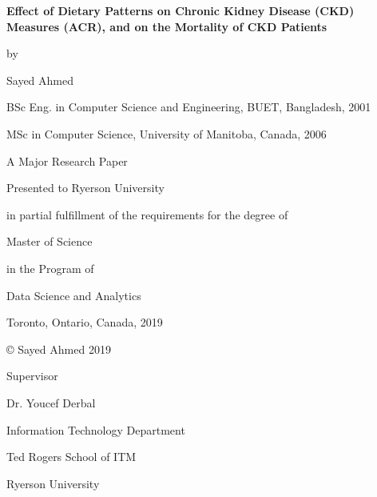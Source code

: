 
\begin{center}

\textbf{Effect of Dietary Patterns on Chronic Kidney Disease (CKD) Measures (ACR), and on the Mortality of CKD Patients}
\vspace{0.75cm}


by
\vspace{0.75cm}



Sayed Ahmed

BSc Eng. in Computer Science and Engineering, BUET, Bangladesh, 2001

MSc in Computer Science, University of Manitoba, Canada, 2006

\vspace{0.75cm}
A Major Research Paper

Presented to Ryerson University

in partial fulfillment of the requirements for the degree of

\vspace{0.75cm}
Master of Science

in the Program of

Data Science and Analytics

\vspace{0.75cm}
Toronto, Ontario, Canada, 2019

\vspace{0.75cm}
© Sayed Ahmed 2019

\vspace{0.75cm}

Supervisor

Dr. Youcef Derbal

Information Technology Department

Ted Rogers School of ITM

Ryerson University

\end{center}
